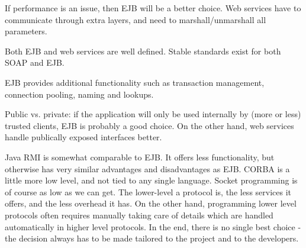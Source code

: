 \documentclass[a4paper,10pt]{article}
\begin{document}
If performance is an issue, then EJB will be a better choice. Web services have to communicate
through extra layers, and need to marshall/unmarshall all parameters.

Both EJB and web services are well defined. Stable standards exist for both SOAP and EJB.

EJB provides additional functionality such as transaction management, connection pooling, naming and
lookups.

Public vs. private: if the application will only be used internally by (more or less) trusted clients,
EJB is probably a good choice. On the other hand, web services handle publically exposed interfaces better.

Java RMI is somewhat comparable to EJB. It offers less functionality, but otherwise has very similar
advantages and disadvantages as EJB. CORBA is a little more low level, and not tied to any single language.
Socket programming is of course as low as we can get. The lower-level a protocol is, the less services it
offers, and the less overhead it has. On the other hand, programming lower level protocols often requires
manually taking care of details which are handled automatically in higher level protocols. In the end,
there is no single best choice - the decision always has to be made tailored to the project
and to the developers.
\end{document}
